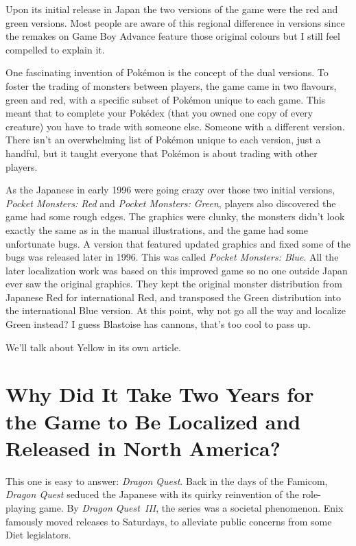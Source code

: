 \documentclass{book}
\begin{document}
Upon its initial release in Japan the two versions of the game were the red and green versions. Most people are aware of this regional difference in versions since the remakes on Game Boy Advance feature those original colours but I still feel compelled to explain it.

One fascinating invention of Pokémon is the concept of the dual versions. To foster the trading of monsters between players, the game came in two flavours, green and red, with a specific subset of Pokémon unique to each game. This meant that to complete your Pokédex (that you owned one copy of every creature) you have to trade with someone else. Someone with a different version. There isn’t an overwhelming list of Pokémon unique to each version, just a handful, but it taught everyone that Pokémon is about trading with other players.

As the Japanese in early 1996 were going crazy over those two initial versions, \emph{Pocket Monsters: Red} and \emph{Pocket Monsters: Green}, players also discovered the game had some rough edges. The graphics were clunky, the monsters didn’t look exactly the same as in the manual illustrations, and the game had some unfortunate bugs. A version that featured updated graphics and fixed some of the bugs was released later in 1996. This was called \emph{Pocket Monsters: Blue}. All the later localization work was based on this improved game so no one outside Japan ever saw the original graphics. They kept the original monster distribution from Japanese Red for international Red, and transposed the Green distribution into the international Blue version. At this point, why not go all the way and localize Green instead? I guess Blastoise has cannons, that’s too cool to pass up.

We’ll talk about Yellow in its own article.

\FloatBarrier\needspace{10mm}\section*{Why Did It Take Two Years for the Game to Be Localized and Released in North America?}\nopagebreak[4]

This one is easy to answer: \emph{Dragon Quest}. Back in the days of the Famicom, \emph{Dragon Quest} seduced the Japanese with its quirky reinvention of the role-playing game. By \emph{Dragon Quest III}, the series was a societal phenomenon. Enix famously moved releases to Saturdays, to alleviate public concerns from some Diet legislators.
\end{document}
